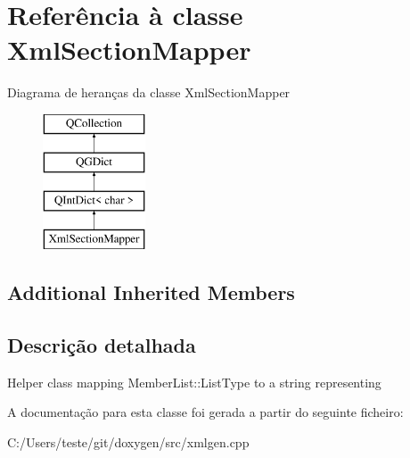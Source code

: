 \hypertarget{class_xml_section_mapper}{\section{Referência à classe Xml\-Section\-Mapper}
\label{class_xml_section_mapper}
}
Diagrama de heranças da classe Xml\-Section\-Mapper\begin{figure}[H]
\begin{center}
\leavevmode
\includegraphics[height=4.000000cm]{class_xml_section_mapper}
\end{center}
\end{figure}
\subsection*{Additional Inherited Members}


\subsection{Descrição detalhada}
Helper class mapping Member\-List\-::\-List\-Type to a string representing 

A documentação para esta classe foi gerada a partir do seguinte ficheiro\-:\begin{DoxyCompactItemize}
\item 
C\-:/\-Users/teste/git/doxygen/src/xmlgen.\-cpp\end{DoxyCompactItemize}
